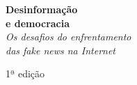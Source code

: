




\begingroup\thispagestyle{empty}\vspace*{.05\textheight} 

              \Huge
              \noindent
              \textbf{Desinformação\\ e democracia}\\
              \smallskip
              \noindent\LARGE\textit{Os desafios do enfrentamento\\ das fake news na Internet}
              
              \vspace{4em}


              \vspace{5em}

              \noindent
              {\normalsize\noindent 1ª edição}

              \vfill

              \newfontfamily{}
              \smallskip


\endgroup
\pagebreak
